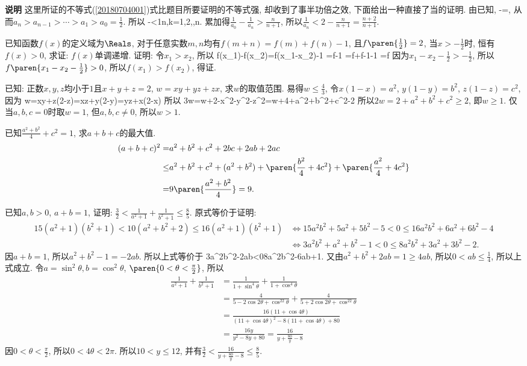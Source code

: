 {\bf{说明}} 这里所证的不等式(\ref{20180704001})式比题目所要证明的不等式强, 却收到了事半功倍之效,
下面给出一种直接了当的证明.
\ea
\ba
由已知, 
\bee
{}-=,
\eee
从而$a_n>a_{n-1}>\cdots>a_1>a_0=\frac12$. 所以
\bee
{}-<\frac1n,\quad k=1,2,\cdots,n.
\eee
累加得$\frac1{a_0}-\frac1{a_n}>\frac{n}{n+1}$, 所以$\frac{1}{a_n}<2-\frac{n}{n+1}=\frac{n+2}{n+1}$.
\ea

\bq{}{}
已知函数$f(x)$的定义域为$\Reals$, 对于任意实数$m,n$均有$f(m+n)=f(m)+f(n)-1$, 且$f\paren{\frac12}=2$, 
当$x>-\frac12$时, 恒有$f(x)>0$, 求证: $f(x)$单调递增.
\eq
\ba
证明: 令$x_1>x_2$, 所以
\bee
f(x_1)-f(x_2)=f(x_1-x_2)-1
  =f-1
  =f+f-1-1
  =f
\eee
因为$x_1-x_2-\frac12>-\frac12$, 所以$f\paren{x_1-x_2-\frac12}>0$, 
所以$f(x_1)>f(x_2)$, 得证.
\ea

\bq{}{}
已知: 正数$x,y,z$均小于$1$且$x+y+z=2$, $w=xy+yz+zx$, 求$w$的取值范围.
\eq
\ba
易得$w\le\frac43$, 令$x(1-x)=a^2$, $y(1-y)=b^2$, $z(1-z)=c^2$, 因为
\bee
w=xy+z(2-z)=xz+y(2-y)=yz+x(2-x)
\eee
所以
\bee
3w=w+2-x^2-y^2-z^2=w+4+a^2+b^2+c^2-2
\eee
所以$2w=2+a^2+b^2+c^2\ge2$, 即$w\ge1$.
仅当$a,b,c=0$时取$w=1$, 但$a,b,c\ne0$, 所以$w>1$.
\ea

\bq{}{}
已知$\frac{a^2+b^2}{4}+c^2=1$, 求$a+b+c$的最大值.
\eq
\ba
\begin{align*}
 (a+b+c)^2 = & a^2+b^2+c^2+2bc+2ab+2ac\\
  \le & a^2+b^2+c^2+(a^2+b^2)+\paren{\frac{b^2}{4}+4c^2}+\paren{\frac{a^2}{4}+4c^2}\\
  = & 9\paren{\frac{a^2+b^2}{4}}=9.
\end{align*}
\ea

\bq{}{}
已知$a,b>0$, $a+b=1$, 证明: $\frac32<\frac1{a^2+1}+\frac1{b^2+1}\le\frac85$.
\eq
\ba
原式等价于证明:
\begin{align*}
 15(a^2+1)(b^2+1)<10(a^2+b^2+2)\le16(a^2+1)(b^2+1)
  & \Longleftrightarrow 15a^2b^2+5a^2+5b^2-5<0\le16a^2b^2+6a^2+6b^2-4\\
  & \Longleftrightarrow 3a^2b^2+a^2+b^2-1<0\le8a^2b^2+3a^2+3b^2-2.
\end{align*}
因$a+b=1$, 所以$a^2+b^2-1=-2ab$. 所以上式等价于
\bee
3a^2b^2-2ab<0\le8a^2b^2-6ab+1.
\eee
又由$a^2+b^2+2ab=1\ge4ab$, 所以$0<ab\le\frac14$, 所以上式成立.
\ea
\ba
令$a=\sin^2\theta, b=\cos^2\theta$, $\paren{0<\theta<\frac{\pi}{2}}$, 所以
\begin{align*}
\frac1{a^2+1}+\frac1{b^2+1}
  &=\frac1{1+\sin^4\theta}+\frac1{1+\cos^4\theta}\\
  &=\frac4{5-2\cos2\theta+\cos^22\theta}+\frac4{5+2\cos2\theta+\cos^22\theta}\\
  &=\frac{16(11+\cos4\theta)}{(11+\cos4\theta)^2-8(11+\cos4\theta)+80}\\
  &=\frac{16y}{y^2-8y+80}=\frac{16}{y+\frac{80}{y}-8}
\end{align*}
因$0<\theta<\frac{\pi}{2}$, 所以$0<4\theta<2\pi$. 所以$10<y\le12$, 并有$\frac32<\frac{16}{y+\frac{80}{y}-8}\le\frac85$.
\ea

